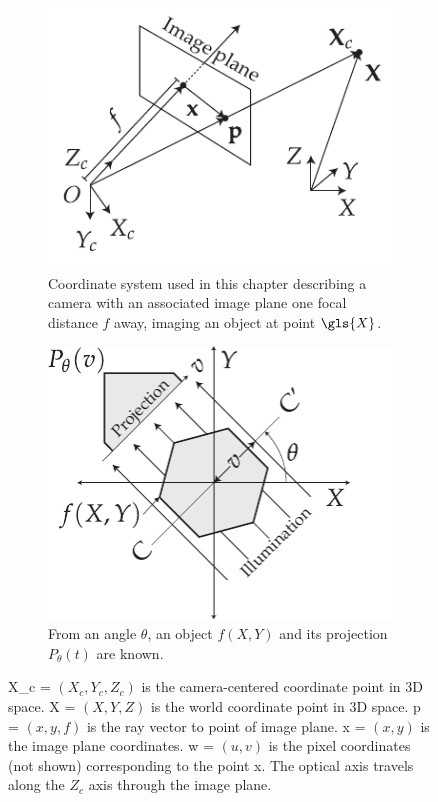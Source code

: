 \documentclass{osa-article}
\begin{document}
\begin{figure}
    \centering
    \begin{subfigure}[t]{0.48\textwidth}
        \centering
        \includegraphics{./figures/coordinate_system}
        \caption[Coordinate system]{Coordinate system used in this chapter describing a camera with an associated image plane one focal distance \(f\) away, imaging an object at point \(\gls{X}\).
        }\label{fig:coordinate_system_flopt}
    \end{subfigure}\hfill
    \begin{subfigure}[t]{0.48\textwidth}
      \centering
      \includegraphics{./figures/OPT_digram}
      \caption[Principle of OPT]{From an angle \(\theta \), an object \(f(X,Y)\) and its projection \(P_\theta(t)\) are known.}\label{fig:OPT_digram}
    \end{subfigure}
    \caption[Coordinates and \gls{OPT}]{\gls{X_c} = \((X_c,Y_c,Z_c)\) is the camera-centered coordinate point in 3D space.
            \gls{X} = \((X,Y,Z)\) is the world coordinate point in 3D space.
            \gls{p} = \((x,y,f)\) is the ray vector to point of image plane.
            \gls{x} = \((x,y)\) is the image plane coordinates.
            \gls{w} = \((u,v)\) is the pixel coordinates (not shown) corresponding to the point \gls{x}.
            The optical axis travels along the \(Z_c\) axis through the image plane.}
\end{figure}
\end{document}
